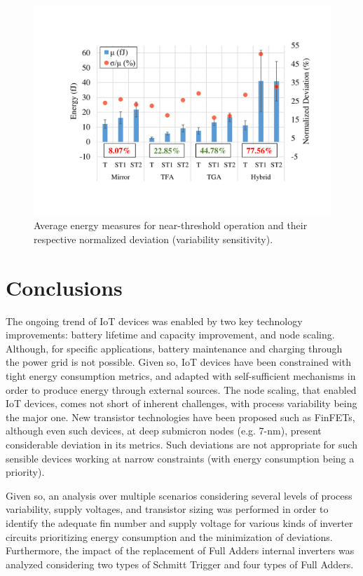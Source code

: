 \documentclass[pgmicro,mestrado,english]{iiufrgs}
\begin{document}

\begin{figure}[]
  \centering
    \includegraphics[width=\textwidth, trim={3.5cm 3cm 2cm 3.5cm}, clip]{averageEnergyNT.pdf}
     \caption{Average energy measures for near-threshold operation and their respective normalized deviation (variability sensitivity).}
  \label{fig:avgEnergyNT}
\end{figure}

\chapter{Conclusions}

The ongoing trend of IoT devices was enabled by two key technology improvements: battery lifetime and capacity improvement, and node scaling. Although, for specific applications, battery maintenance and charging through the power grid is not possible. Given so, IoT devices have been constrained with tight energy consumption metrics, and adapted with self-sufficient mechanisms in order to produce energy through external sources. The node scaling, that enabled IoT devices, comes not short of inherent challenges, with process variability being the major one. New transistor technologies have been proposed such as FinFETs, although even such devices, at deep submicron nodes (e.g. 7-nm), present considerable deviation in its metrics. Such deviations are not appropriate for such sensible devices working at narrow constraints (with energy consumption being a priority).

Given so, an analysis over multiple scenarios considering several levels of process variability, supply voltages, and transistor sizing was performed in order to identify the adequate fin number and supply voltage for various kinds of inverter circuits prioritizing energy consumption and the minimization of deviations. Furthermore, the impact of the replacement of Full Adders internal inverters was analyzed considering two types of Schmitt Trigger and four types of Full Adders.
\end{document}
